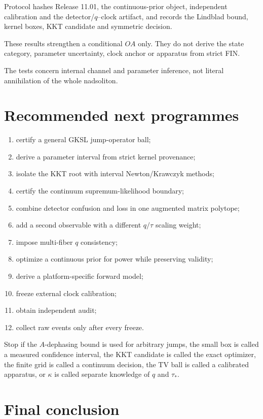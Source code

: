 \documentclass[11pt,a4paper]{article}
\begin{document}
Protocol  hashes Release 11.01,
the continuous-prior object, independent calibration and the detector/$q$--clock
artifact, and records the Lindblad bound, kernel boxes, KKT candidate and
symmetric decision.

These results strengthen a conditional $OA$ only.  They do not derive the
state category, parameter uncertainty, clock anchor or apparatus from strict
FIN.

The tests concern internal channel and parameter inference, not literal
annihilation of the whole nadsoliton.

\section{Recommended next programmes}

\begin{enumerate}
\item certify a general GKSL jump-operator ball;
\item derive a parameter interval from strict kernel provenance;
\item isolate the KKT root with interval Newton/Krawczyk methods;
\item certify the continuum supremum-likelihood boundary;
\item combine detector confusion and loss in one augmented matrix polytope;
\item add a second observable with a different $q/\tau$ scaling weight;
\item impose multi-fiber $q$ consistency;
\item optimize a continuous prior for power while preserving validity;
\item derive a platform-specific forward model;
\item freeze external clock calibration;
\item obtain independent audit;
\item collect raw events only after every freeze.
\end{enumerate}

Stop if the $A$-dephasing bound is used for arbitrary jumps, the small box is
called a measured confidence interval, the KKT candidate is called the exact
optimizer, the finite grid is called a continuum decision, the TV ball is
called a calibrated apparatus, or $\kappa$ is called separate knowledge of
$q$ and $\tau_*$. 

\section{Final conclusion}
\end{document}
